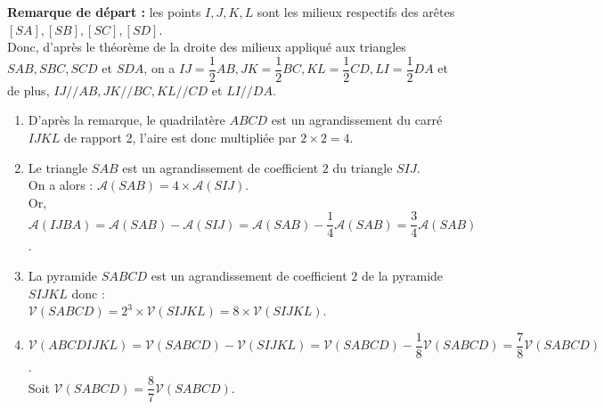    {\bf Remarque de départ :} les points $I, J, K, L$ sont les milieux respectifs des arêtes $[SA], [SB], [SC], [SD]$. \\
   Donc, d'après le théorème de la droite des milieux appliqué aux triangles $SAB, SBC, SCD$ et $SDA$, on a $IJ =\dfrac12 AB, JK =\dfrac12 BC, KL =\dfrac12 CD, LI =\dfrac12DA$ et de plus, $IJ // AB, JK // BC, KL // CD$ et $LI // DA$. \\ [2mm]
   \begin{enumerate}
      \item D'après la remarque, le quadrilatère $ABCD$ est un  agrandissement du carré $IJKL$ de rapport 2, l'aire est donc multipliée par $2\times2 =4$. \\
      \item Le triangle $SAB$ est un agrandissement de coefficient $2$ du triangle $SIJ$. \\
      On a alors : $\mathcal{A}(SAB) =4\times \mathcal{A}(SIJ)$. \\
      Or, $\mathcal{A}(IJBA) =\mathcal{A}(SAB)-\mathcal{A}(SIJ) =\mathcal{A}(SAB)-\dfrac14\mathcal{A}(SAB) =\dfrac34\mathcal{A}(SAB)$. \\
      \item La pyramide $SABCD$ est un agrandissement de coefficient $2$ de la pyramide $SIJKL$ donc : \\
      $\mathcal{V}(SABCD) =2^3\times \mathcal{V}(SIJKL) =8\times\mathcal{V}(SIJKL)$. \\
      \item $\mathcal{V}(ABCDIJKL) =\mathcal{V}(SABCD)-\mathcal{V}(SIJKL) =\mathcal{V}(SABCD)-\dfrac18\mathcal{V}(SABCD) =\dfrac78\mathcal{V}(SABCD)$. \\
      Soit $\mathcal{V}(SABCD) =\dfrac87\mathcal{V}(SABCD)$. \\ [1mm]
   \end{enumerate}
